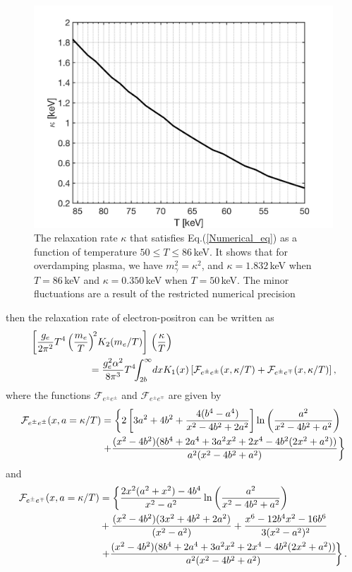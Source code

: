 \begin{figure} 
\centerline{
\includegraphics[width=\linewidth]{./plots/OverdampingKappa.jpg}}
\caption{The relaxation rate $\kappa$ that satisfies Eq.(\ref{Numerical_eq}) as a function of temperature $50\leqslant T\leqslant 86$\,keV. It shows that for overdamping plasma, we have $m^2_\gamma=\kappa^2$, and $\kappa=1.832$\,keV when $T=86$\,keV and $\kappa=0.350$\,keV when $T=50$\,keV. The minor fluctuations are a result of the restricted numerical precision}
\label{KappaSol.fig} 
\end{figure}

then the relaxation rate of electron-positron can be written as
\begin{align}\label{Numerical_eq}
&\left[\frac{g_e}{2\pi^2}T^4\left(\frac{m_e}{T}\right)^{\!2}\!K_2(m_e/T)\right]\,\left(\frac{\kappa}{T}\right)\notag\\
&\qquad\qquad\qquad=\frac{g^2_e\alpha^2}{8\pi^3}T^4\!\!\int_{2b}^\infty\!dxK_1(x)\left[\mathcal{F}_{e^\pm e^\pm}(x,\kappa/T)+\mathcal{F}_{e^\pm e^\mp}(x,\kappa/T)\right],
\end{align}
where the functions $\mathcal{F}_{e^\pm e^\pm}$ and $\mathcal{F}_{e^\pm e^\mp}$ are given by
\begin{align}
\mathcal{F}_{e^\pm e^\pm}(x,a=\kappa/T)&=\left\{2\left[3a^2+4b^2+\frac{4(b^4-a^4)}{x^2-4b^2+2a^2}\right]\ln\left(\frac{a^2}{x^2-4b^2+a^2}\right)\right.\notag\\
&\left.+\frac{(x^2-4b^2)(8b^4+2a^4+3a^2x^2+2x^4-4b^2(2x^2+a^2))}{a^2(x^2-4b^2+a^2)}\right\}
\end{align}
and 
\begin{align}
\mathcal{F}_{e^\pm e^\mp}(x,a=\kappa/T)&=\left\{\frac{2x^2(a^2+x^2)-4b^4}{x^2-a^2}\ln\left(\frac{a^2}{x^2-4b^2+a^2}\right)\right.\notag\\
&+\frac{(x^2-4b^2)(3x^2+4b^2+2a^2)}{(x^2-a^2)}+\frac{x^6-12b^4x^2-16b^6}{3(x^2-a^2)^2}\notag\\
&\left.+\frac{(x^2-4b^2)(8b^4+2a^4+3a^2x^2+2x^4-4b^2(2x^2+a^2))}{a^2(x^2-4b^2+a^2)}\!\right\}.
\end{align}

